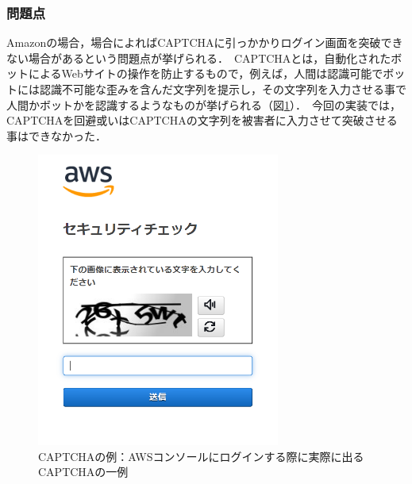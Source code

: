 \documentclass[dvipdfmx,twocolumn,9pt]{jsarticle}
\begin{document}
            \subsubsection{問題点}
                Amazonの場合，場合によればCAPTCHAに引っかかりログイン画面を突破できない場合があるという問題点が挙げられる．\
                CAPTCHAとは，自動化されたボットによるWebサイトの操作を防止するもので，例えば，人間は認識可能でボットには認識不可能な歪みを含んだ文字列を提示し，その文字列を入力させる事で人間かボットかを認識するようなものが挙げられる（図\ref{captcha}）．\
                今回の実装では，CAPTCHAを回避或いはCAPTCHAの文字列を被害者に入力させて突破させる事はできなかった．\
                \begin{figure}[h]
                    \centering
                    \includegraphics[width=8cm]{img/captcha.png}
                    \caption{CAPTCHAの例：AWSコンソールにログインする際に実際に出るCAPTCHAの一例}
                    \label{captcha}
                \end{figure}
\end{document}
